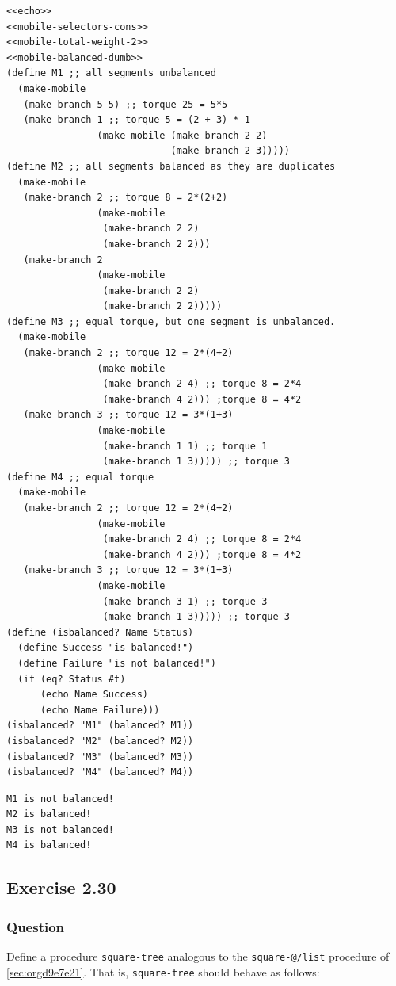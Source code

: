 \documentclass[final,fleqn,titlepage,twoside]{article}
\begin{document}
\begin{verbatim}
<<echo>>
<<mobile-selectors-cons>>
<<mobile-total-weight-2>>
<<mobile-balanced-dumb>>
(define M1 ;; all segments unbalanced
  (make-mobile
   (make-branch 5 5) ;; torque 25 = 5*5
   (make-branch 1 ;; torque 5 = (2 + 3) * 1
                (make-mobile (make-branch 2 2)
                             (make-branch 2 3)))))
(define M2 ;; all segments balanced as they are duplicates
  (make-mobile
   (make-branch 2 ;; torque 8 = 2*(2+2)
                (make-mobile
                 (make-branch 2 2)
                 (make-branch 2 2)))
   (make-branch 2
                (make-mobile
                 (make-branch 2 2)
                 (make-branch 2 2)))))
(define M3 ;; equal torque, but one segment is unbalanced.
  (make-mobile
   (make-branch 2 ;; torque 12 = 2*(4+2)
                (make-mobile
                 (make-branch 2 4) ;; torque 8 = 2*4
                 (make-branch 4 2))) ;torque 8 = 4*2
   (make-branch 3 ;; torque 12 = 3*(1+3)
                (make-mobile
                 (make-branch 1 1) ;; torque 1
                 (make-branch 1 3))))) ;; torque 3
(define M4 ;; equal torque
  (make-mobile
   (make-branch 2 ;; torque 12 = 2*(4+2)
                (make-mobile
                 (make-branch 2 4) ;; torque 8 = 2*4
                 (make-branch 4 2))) ;torque 8 = 4*2
   (make-branch 3 ;; torque 12 = 3*(1+3)
                (make-mobile
                 (make-branch 3 1) ;; torque 3
                 (make-branch 1 3))))) ;; torque 3
(define (isbalanced? Name Status)
  (define Success "is balanced!")
  (define Failure "is not balanced!")
  (if (eq? Status #t)
      (echo Name Success)
      (echo Name Failure)))
(isbalanced? "M1" (balanced? M1))
(isbalanced? "M2" (balanced? M2))
(isbalanced? "M3" (balanced? M3))
(isbalanced? "M4" (balanced? M4))
\end{verbatim}

\begin{verbatim}
M1 is not balanced! 
M2 is balanced! 
M3 is not balanced! 
M4 is balanced! 
\end{verbatim}

\subsection{Exercise 2.30}
\label{sec:org4469e80}
\subsubsection{Question}
\label{sec:org8b3d580}
Define a procedure
\texttt{square-tree} analogous to the \texttt{square-@/list} procedure of
\ref{sec:orgd9e7e21}.  That is, \texttt{square-tree} should behave as follows:
\end{document}
